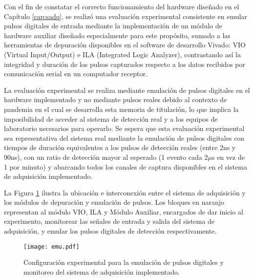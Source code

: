 
Con el fin de constatar el correcto funcionamiento del hardware diseñado en el Capítulo \ref{cap:sadq}, se realizó una evaluación experimental consistente en emular pulsos digitales de entrada mediante la implementación de un módulo de hardware auxiliar diseñado especialmente para este propósito, sumado a las herramientas de depuración disponibles en el software de desarrollo Vivado: VIO (Virtual Input/Output)\cite{XilinxVirtualSuite} e ILA (Integrated Logic Analyzer)\cite{XilinxIntegratedPG172}, contrastando así la integridad y duración de los pulsos capturados respecto a los datos recibidos por comunicación serial en un computador receptor. 

La evaluación experimental se realiza mediante emulación de pulsos digitales en el hardware implementado y no mediante pulsos reales debido al contexto de pandemia en el cual se desarrolla esta memoria de titulación, lo que implica la imposibilidad de acceder al sistema de detección real y a los equipos de laboratorio necesarios para operarlo. Se espera que esta evaluación experimental sea representativa del sistema real mediante la emulación de pulsos digitales con tiempos de duración equivalentes a los pulsos de detección reales (entre 2ns y 90ns), con un ratio de detección mayor al esperado (1 evento cada 2$\mu$s en vez de 1 por minuto) y abarcando todos los canales de captura disponibles en el sistema de adquisición implementado.

La Figura \ref{fig:emu} ilustra la ubicación e interconexión entre el sistema de adquisición y los módulos de depuración y emulación de pulsos. Los bloques en naranjo representan al módulo VIO, ILA y Módulo Auxiliar, encargados de dar inicio al experimento, monitorear las señales de entrada y salida del sistema de adquisición, y emular los pulsos digitales de detección respectivamente.

\begin{figure}[ht]
	\centering
	\texttt{[image: emu.pdf]}
	\caption{Configuración experimental para la emulación de pulsos digitales y monitoreo del sistema de adquisición implementado.}
	\label{fig:emu}
\end{figure}

